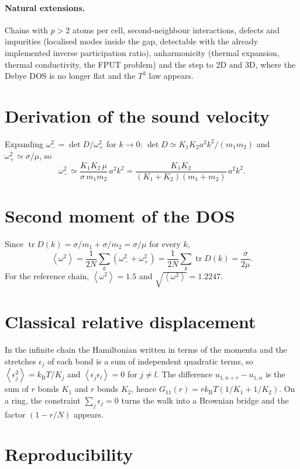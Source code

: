 \documentclass[11pt,a4paper]{article}
\newcommand{\kB}{k_{\mathrm B}}
\newcommand{\avg}[1]{\left\langle #1\right\rangle}
\begin{document}
\paragraph{Natural extensions.} Chains with $p>2$ atoms per cell,
second-neighbour interactions, defects and impurities (localised modes inside
the gap, detectable with the already implemented inverse participation ratio),
anharmonicity (thermal expansion, thermal conductivity, the FPUT problem) and
the step to 2D and 3D, where the Debye DOS is no longer flat and the $T^3$ law
appears.

\appendix
\section{Derivation of the sound velocity}

Expanding $\omega_-^2=\det D/\omega_+^2$ for $k\to0$:
$\det D\simeq K_1K_2a^2k^2/(m_1m_2)$ and $\omega_+^2\simeq\sigma/\mu$, so
\[
\omega_-^2\simeq\frac{K_1K_2\,\mu}{\sigma\,m_1m_2}\,a^2k^2
=\frac{K_1K_2}{(K_1+K_2)(m_1+m_2)}\,a^2k^2 .
\]

\section{Second moment of the DOS}

Since $\operatorname{tr}D(k)=\sigma/m_1+\sigma/m_2=\sigma/\mu$ for every $k$,
\[
\avg{\omega^2}=\frac{1}{2N}\sum_{k}\left(\omega_-^2+\omega_+^2\right)
=\frac{1}{2N}\sum_k\operatorname{tr}D(k)=\frac{\sigma}{2\mu}.
\]
For the reference chain, $\avg{\omega^2}=1.5$ and $\sqrt{\avg{\omega^2}}=1.2247$.

\section{Classical relative displacement}

In the infinite chain the Hamiltonian written in terms of the momenta and the
stretches $\epsilon_j$ of each bond is a sum of independent quadratic terms, so
$\avg{\epsilon_j^2}=\kB T/K_j$ and $\avg{\epsilon_j\epsilon_l}=0$ for $j\neq l$.
The difference $u_{1,n+r}-u_{1,n}$ is the sum of $r$ bonds $K_1$ and $r$ bonds
$K_2$, hence $G_{11}(r)=r\kB T(1/K_1+1/K_2)$. On a ring, the constraint
$\sum_j\epsilon_j=0$ turns the walk into a Brownian bridge and the factor
$(1-r/N)$ appears.

\section{Reproducibility}
\end{document}
